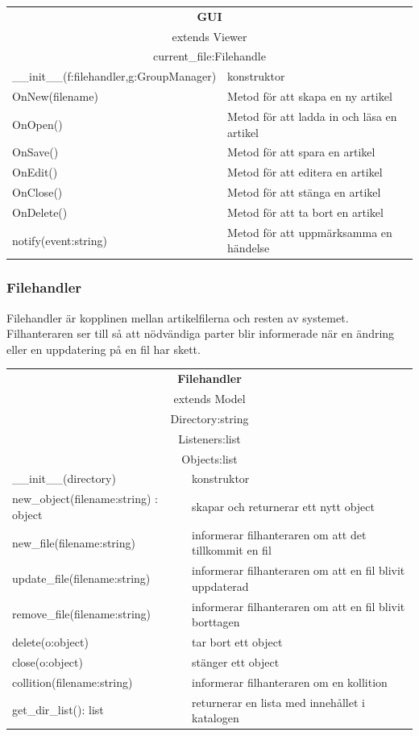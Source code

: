 \begin{tabular}{|l|p{10 cm}|}
\hline
\multicolumn{2}{|c|}{\textbf{GUI}} \\
\multicolumn{2}{|c|}{extends Viewer} \\
\hline
\multicolumn{2}{|c|}{current\_file:Filehandle} \\
\hline
\_\_init\_\_(f:filehandler,g:GroupManager) &konstruktor\\
OnNew(filename) & Metod för att skapa en ny artikel\\
OnOpen() & Metod för att ladda in och läsa en artikel \\ 
OnSave() & Metod för att spara en artikel \\
OnEdit() & Metod för att editera en artikel \\
OnClose() & Metod för att stänga en artikel \\
OnDelete() & Metod för att ta bort en artikel\\
notify(event:string) & Metod för att uppmärksamma en händelse\\
\hline
\end{tabular}

\subsubsection{Filehandler}
Filehandler är kopplinen mellan artikelfilerna och resten av systemet. Filhanteraren ser till så att nödvändiga parter blir informerade när en ändring eller en uppdatering på en fil har skett. 

\begin{tabular}{|l|p{10 cm}|}
\hline
\multicolumn{2}{|c|}{\textbf{Filehandler}} \\
\multicolumn{2}{|c|}{extends Model} \\
\hline
\multicolumn{2}{|c|}{Directory:string} \\
\multicolumn{2}{|c|}{Listeners:list} \\
\multicolumn{2}{|c|}{Objects:list} \\
\hline
\_\_init\_\_(directory) &konstruktor\\
new\_object(filename:string) : object & skapar och returnerar ett nytt object\\
new\_file(filename:string) & informerar filhanteraren om att det tillkommit en fil\\
update\_file(filename:string) & informerar filhanteraren om att en fil blivit uppdaterad\\
remove\_file(filename:string) & informerar filhanteraren om att en fil blivit borttagen\\
delete(o:object) & tar bort ett object\\
close(o:object) & stänger ett object\\
collition(filename:string) & informerar filhanteraren om en kollition\\
get\_dir\_list(): list & returnerar en lista med innehållet i katalogen\\
\hline
\end{tabular}

